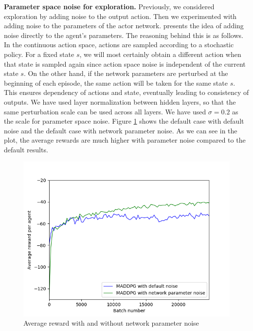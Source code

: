 \documentclass{article}
\begin{document}
\textbf{Parameter space noise for exploration.} Previously, we considered exploration by adding noise to the output action. Then we experimented with adding noise to the parameters of the actor network. \cite{plappert2017parameter} presents the idea of adding noise directly to the agent's parameters. The reasoning behind this is as follows. In the continuous action space, actions are sampled according to a stochastic policy. For a fixed state $s$, we will most certainly obtain a different action when that state is sampled again since action space noise is independent of the current state $s$. On the other hand, if the network parameters are perturbed at the beginning of each episode, the same action will be taken for the same state $s$. This ensures dependency of actions and state, eventually leading to consistency of outputs. We have used layer normalization between hidden layers, so that the same perturbation scale can be used across all layers. We have used $\sigma = 0.2$ as the scale for parameter space noise. Figure \ref{fig:parameter_noise_exploration} shows the default case with default noise and the default case with network parameter noise. As we can see in the plot, the average rewards are much higher with parameter noise compared to the default results.  

\begin{figure}
\begin{center}
\includegraphics[scale=0.45]{network_parameter_exploration}
\end{center}
\caption{Average reward with and without network parameter noise}
\label{fig:parameter_noise_exploration}
\end{figure}
\end{document}
